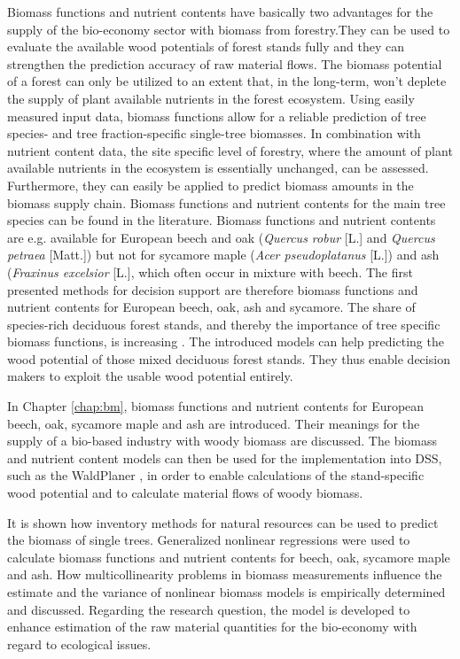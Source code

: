 Biomass functions and nutrient contents have basically two advantages for the supply of the bio-economy sector with biomass from forestry.They can be used to evaluate the available wood potentials of forest stands fully and they can strengthen the prediction accuracy of raw material flows. The biomass potential of a forest can only be utilized to an extent that, in the long-term, won't deplete the supply of plant available nutrients in the forest ecosystem. Using easily measured input data, biomass functions allow for a reliable prediction of tree species- and tree fraction-specific single-tree biomasses. In combination with nutrient content data, the site specific level of forestry, where the amount of plant available nutrients in the ecosystem is essentially unchanged, can be assessed. Furthermore, they can easily be applied to predict biomass amounts in the biomass supply chain. Biomass functions and nutrient contents for the main tree species can be found in the literature. Biomass functions and nutrient contents are e.g. available for European beech and oak (\textit{Quercus robur} [L.] and \textit{Quercus petraea} [Matt.]) but not for sycamore maple (\textit{Acer pseudoplatanus} [L.]) and ash (\textit{Fraxinus excelsior} [L.], which often occur in mixture with beech. The first presented methods for decision support are therefore biomass functions and nutrient contents for European beech, oak, ash and sycamore. The share of species-rich deciduous forest stands, and thereby the importance of tree specific biomass functions, is increasing \citep{ti_2014}. The introduced models can help predicting the wood potential of those mixed deciduous forest stands. They thus enable decision makers to exploit the usable wood potential entirely.

In Chapter \ref{chap:bm}, biomass functions and nutrient contents for European beech, oak, sycamore maple and ash are introduced. Their meanings for the supply of a bio-based industry with woody biomass are discussed. The biomass and nutrient content models can then be used for the implementation into DSS, such as the WaldPlaner \citep{hansen_2014}, in order to enable calculations of the stand-specific wood potential and to calculate material flows of woody biomass.

It is shown how inventory methods for natural resources can be used to predict the biomass of single trees. Generalized nonlinear regressions were used to calculate biomass functions and nutrient contents for beech, oak, sycamore maple and ash. How multicollinearity problems in biomass measurements influence the estimate and the variance of nonlinear biomass models is empirically determined and discussed. Regarding the research question, the model is developed to enhance estimation of the raw material quantities for the bio-economy with regard to ecological issues.

